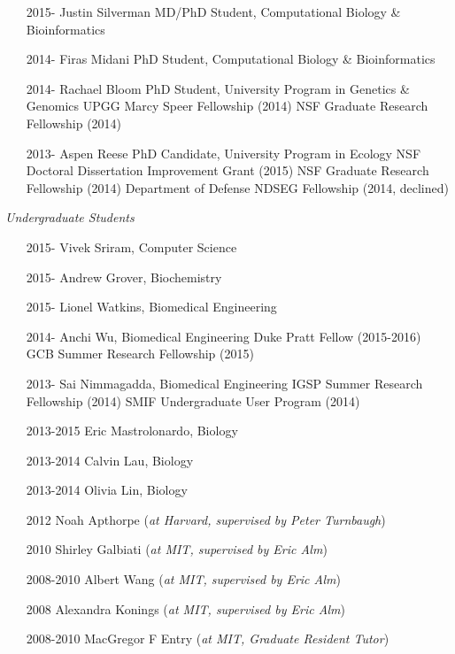\documentclass[overlapped,line,11pt]{res}
\begin{document}
\begin{resume}
\begin{itemize}[leftmargin=2cm, style=sameline, itemsep=0mm]

\item[2015-] Justin Silverman \newline 
  MD/PhD Student, Computational Biology \& Bioinformatics
\item[2014-] Firas Midani \newline 
  PhD Student, Computational Biology \& Bioinformatics
\item[2014-] Rachael Bloom \newline 
  PhD Student, University Program in Genetics \& Genomics \newline
  UPGG Marcy Speer Fellowship (2014) \newline
  NSF Graduate Research Fellowship (2014)
\item[2013-] Aspen Reese \newline 
  PhD Candidate, University Program in Ecology \newline
  NSF Doctoral Dissertation Improvement Grant (2015) \newline
  NSF Graduate Research Fellowship (2014) \newline
  Department of Defense NDSEG Fellowship (2014, declined)

\end{itemize}

\vspace{-.1in}
\emph{Undergraduate Students}
\vspace{.1in}
\begin{itemize}[leftmargin=2cm, style=sameline, itemsep=0mm]

\item[2015-] Vivek Sriram, Computer Science
\item[2015-] Andrew Grover, Biochemistry 
\item[2015-] Lionel Watkins, Biomedical Engineering 
\item[2014-] Anchi Wu, Biomedical Engineering \newline 
  Duke Pratt Fellow (2015-2016)
  GCB Summer Research Fellowship (2015)
\item[2013-] Sai Nimmagadda, Biomedical Engineering \newline
  IGSP Summer Research Fellowship (2014) \newline
  SMIF Undergraduate User Program (2014)
\item[2013-2015] Eric Mastrolonardo, 
  Biology 
\item[2013-2014] Calvin Lau, Biology 
\item[2013-2014] Olivia Lin, Biology
\item[2012] Noah Apthorpe (\emph{at Harvard, supervised by Peter Turnbaugh})
\item[2010] Shirley Galbiati (\emph{at MIT, supervised by Eric Alm})
\item[2008-2010] Albert Wang (\emph{at MIT, supervised by Eric Alm})
\item[2008] Alexandra Konings (\emph{at MIT, supervised by Eric Alm})
\item[2008-2010] MacGregor F Entry (\emph{at MIT, Graduate Resident Tutor})
\end{itemize}


\end{resume}
\end{document}

